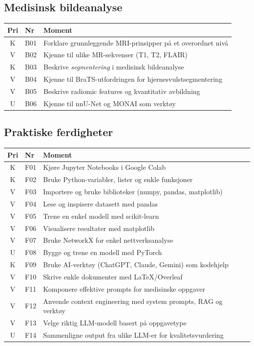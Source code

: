 \documentclass[11pt,a4paper]{article}
\begin{document}
\subsection{Medisinsk bildeanalyse}

\begin{longtable}{@{}clp{9cm}@{}}
\toprule
\textbf{Pri} & \textbf{Nr} & \textbf{Moment} \\
\midrule
\endfirsthead
\midrule
\endhead
\midrule
\endfoot
\bottomrule
\endlastfoot
K & B01 & Forklare grunnleggende MRI-prinsipper på et overordnet nivå \\
V & B02 & Kjenne til ulike MR-sekvenser (T1, T2, FLAIR) \\
K & B03 & Beskrive \emph{segmentering} i medisinsk bildeanalyse \\
V & B04 & Kjenne til BraTS-utfordringen for hjernesvulstsegmentering \\
V & B05 & Beskrive radiomic features og kvantitativ avbildning \\
U & B06 & Kjenne til nnU-Net og MONAI som verktøy \\
\end{longtable}

\subsection{Praktiske ferdigheter}

\begin{longtable}{@{}clp{9cm}@{}}
\toprule
\textbf{Pri} & \textbf{Nr} & \textbf{Moment} \\
\midrule
\endfirsthead
\midrule
\endhead
\midrule
\endfoot
\bottomrule
\endlastfoot
K & F01 & Kjøre Jupyter Notebooks i Google Colab \\
K & F02 & Bruke Python-variabler, lister og enkle funksjoner \\
V & F03 & Importere og bruke biblioteker (numpy, pandas, matplotlib) \\
V & F04 & Lese og inspisere datasett med pandas \\
V & F05 & Trene en enkel modell med scikit-learn \\
V & F06 & Visualisere resultater med matplotlib \\
V & F07 & Bruke NetworkX for enkel nettverksanalyse \\
U & F08 & Bygge og trene en modell med PyTorch \\
K & F09 & Bruke AI-verktøy (ChatGPT, Claude, Gemini) som kodehjelp \\
V & F10 & Skrive enkle dokumenter med LaTeX/Overleaf \\
V & F11 & Komponere effektive prompts for medisinske oppgaver \\
V & F12 & Anvende context engineering med system prompts, RAG og verktøy \\
V & F13 & Velge riktig LLM-modell basert på oppgavetype \\
U & F14 & Sammenligne output fra ulike LLM-er for kvalitetsvurdering \\
\end{longtable}
\end{document}
